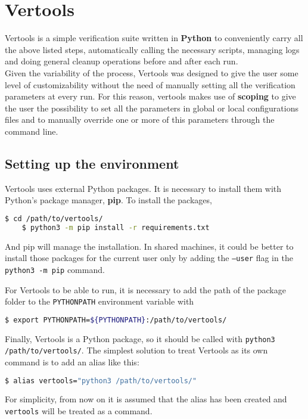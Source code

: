 \section{Vertools}
Vertools is a simple verification suite written in \textbf{Python} to conveniently carry all the above listed steps, automatically calling the necessary scripts, managing logs and doing general cleanup operations before and after each run.\\
Given the variability of the process, Vertools was designed to give the user some level of customizability without the need of manually setting all the verification parameters at every run. For this reason, vertools makes use of \textbf{scoping} to give the user the possibility to set all the parameters in global or local configurations files and to manually override one or more of this parameters through the command line.

\subsection{Setting up the environment}
Vertools uses external Python packages. It is necessary to install them with Python's package manager, \textbf{pip}. To install the packages,
\begin{lstlisting}[language=bash]
    $ cd /path/to/vertools/
    $ python3 -m pip install -r requirements.txt
\end{lstlisting}
And pip will manage the installation. In shared machines, it could be better to install those packages for the current user only by adding the \texttt{--user} flag in the \texttt{python3 -m pip} command.

For Vertools to be able to run, it is necessary to add the path of the package folder to the \texttt{PYTHONPATH} environment variable with
\begin{lstlisting}[language=bash]
    $ export PYTHONPATH=${PYTHONPATH}:/path/to/vertools/
\end{lstlisting}

Finally, Vertools is a Python package, so it should be called with \texttt{python3 /path/to/vertools/}. The simplest solution to treat Vertools as its own command is to add an alias like this:
\begin{lstlisting}[language=bash]
    $ alias vertools="python3 /path/to/vertools/"
\end{lstlisting}

For simplicity, from now on it is assumed that the alias has been created and \texttt{vertools} will be treated as a command.

